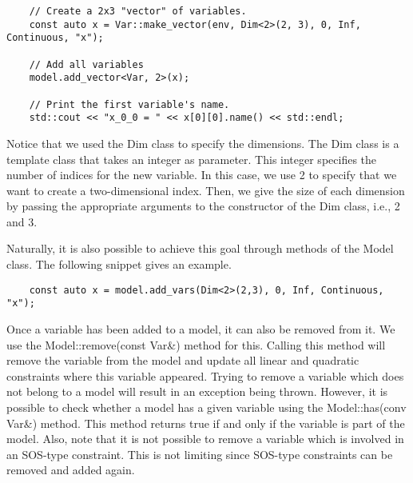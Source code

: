 \begin{lstlisting}
    // Create a 2x3 "vector" of variables.
    const auto x = Var::make_vector(env, Dim<2>(2, 3), 0, Inf, Continuous, "x");

    // Add all variables
    model.add_vector<Var, 2>(x);

    // Print the first variable's name.
    std::cout << "x_0_0 = " << x[0][0].name() << std::endl;
\end{lstlisting}

Notice that we used the \textsf{Dim} class to specify the dimensions. The
\textsf{Dim} class is a template class that takes an integer as parameter.
This integer specifies the number of indices for the new variable. In this
case, we use 2 to specify that we want to create a two-dimensional index.
Then, we give the size of each dimension by passing the appropriate arguments
to the constructor of the \textsf{Dim} class, i.e., 2 and 3. 

Naturally, it is also possible to achieve this goal through methods of the
\textsf{Model} class. The following snippet gives an example.

\begin{lstlisting}
    const auto x = model.add_vars(Dim<2>(2,3), 0, Inf, Continuous, "x");
\end{lstlisting}

Once a variable has been added to a model, it can also be removed from it. We
use the \textsf{Model::remove(const Var\&)} method for this. Calling this
method will remove the variable from the model and update all linear and
quadratic constraints where this variable appeared. Trying to remove a
variable which does not belong to a model will result in an exception being
thrown. However, it is possible to check whether a model has a given variable
using the \textsf{Model::has(conv Var\&)} method. This method returns true if
and only if the variable is part of the model. Also, note that it is not
possible to remove a variable which is involved in an SOS-type constraint.
This is not limiting since SOS-type constraints can be removed and added
again.

